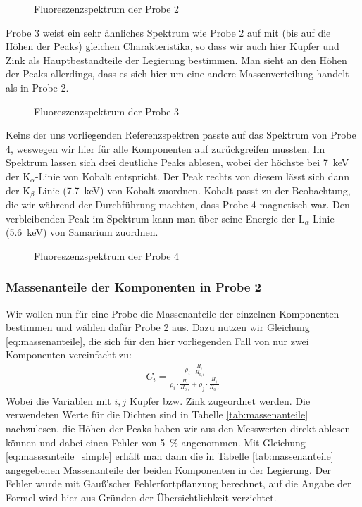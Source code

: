 \documentclass[11pt, a4paper]{article}
\begin{document}
\begin{figure}[!h]
\centering

\caption{Fluoreszenzspektrum der Probe 2}
\label{fig:probe2}
\end{figure}

Probe 3 weist ein sehr ähnliches Spektrum wie Probe 2 auf mit (bis auf die Höhen der Peaks) gleichen Charakteristika, so dass wir auch hier Kupfer und Zink als Hauptbestandteile der Legierung bestimmen.
Man sieht an den Höhen der Peaks allerdings, dass es sich hier um eine andere Massenverteilung handelt als in Probe 2.

\begin{figure}[!h]
\centering

\caption{Fluoreszenzspektrum der Probe 3}
\label{fig:probe3}
\end{figure}

Keins der uns vorliegenden Referenzspektren passte auf das Spektrum von Probe 4, weswegen wir hier für alle Komponenten auf \cite{booklet} zurückgreifen mussten.
Im Spektrum lassen sich drei deutliche Peaks ablesen, wobei der höchste bei \SI{7}{\kilo\electronvolt} der K$_{\alpha}$-Linie von Kobalt entspricht.
Der Peak rechts von diesem lässt sich dann der K$_{\beta}$-Linie (\SI{7.7}{\kilo\electronvolt}) von Kobalt zuordnen.
Kobalt passt zu der Beobachtung, die wir während der Durchführung machten, dass Probe 4 magnetisch war.
Den verbleibenden Peak im Spektrum kann man über seine Energie der L$_{\alpha}$-Linie (\SI{5.6}{\kilo\electronvolt}) von Samarium zuordnen. 

\begin{figure}[!h]
\centering

\caption{Fluoreszenzspektrum der Probe 4}
\label{fig:probe4}
\end{figure}

\subsubsection{Massenanteile der Komponenten in Probe 2}

Wir wollen nun für eine Probe die Massenanteile der einzelnen Komponenten bestimmen und wählen dafür Probe 2 aus.
Dazu nutzen wir Gleichung \ref{eq:massenanteile}, die sich für den hier vorliegenden Fall von nur zwei Komponenten vereinfacht zu:
\begin{align}
C_i = \frac{\rho_i \cdot \frac{H_i}{H_{0,i}}}{\rho_i \cdot \frac{H_i}{H_{0,i}}+\rho_j \cdot \frac{H_j}{H_{0,j}}}
\label{eq:masseanteile_simple}
\end{align}
Wobei die Variablen mit $i, j$ Kupfer bzw. Zink zugeordnet werden.
Die verwendeten Werte für die Dichten sind in Tabelle \ref{tab:massenanteile} nachzulesen, die Höhen der Peaks haben wir aus den Messwerten direkt ablesen können und dabei einen Fehler von \SI{5}{\percent} angenommen.
Mit Gleichung \ref{eq:masseanteile_simple} erhält man dann die in Tabelle \ref{tab:massenanteile} angegebenen Massenanteile der beiden Komponenten in der Legierung.
Der Fehler wurde mit Gauß'scher Fehlerfortpflanzung berechnet, auf die Angabe der Formel wird hier aus Gründen der Übersichtlichkeit verzichtet.
\end{document}
